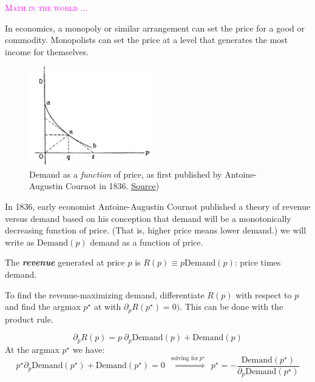 \documentclass[
  letterpaper,
  DIV=11,
  numbers=noendperiod,
  oneside]{scrreprt}
\newenvironment{intheworld}%
{%
\textcolor{magenta}{\hrulefill}%
  \par\vspace{.3\baselineskip}%
  \textcolor{magenta}{\scshape Math in the world ...}%
  \par\vspace{\baselineskip}%
}%
{\textcolor{magenta}{\hrulefill}}
\begin{document}
\begin{intheworld}

In economics, a monopoly or similar arrangement can set the price for a
good or commodity. Monopolists can set the price at a level that
generates the most income for themselves.

\begin{figure}

{\centering \includegraphics[width=0.5\textwidth,height=\textheight]{Differentiation/www/cournot-demand-curve.png}

}

\caption{\label{fig-cournot-demand2}Demand as a \emph{function} of
price, as first published by Antoine-Augustin Cournot in 1836.
\href{https://www.richmondfed.org/~/media/richmondfedorg/publications/research/economic_review/1992/pdf/er780201.pdf}{Source})}

\end{figure}

In 1836, early economist Antoine-Augustin Cournot published a theory of
revenue versus demand based on his conception that demand will be a
monotonically decreasing function of price. (That is, higher price means
lower demand.) we will write as \(\text{Demand}(p)\) demand as a
function of price.

The \textbf{\emph{revenue}} generated at price \(p\) is
\(R(p) \equiv p \text{Demand}(p)\): price times demand.

To find the revenue-maximizing demand, differentiate \(R(p)\) with
respect to \(p\) and find the argmax \(p^\star\) at with
\(\partial_p R(p^\star) = 0).\) This can be done with the product rule.

\[\partial_p R(p) = p \ \partial_p \text{Demand}(p) + \text{Demand}(p)\]
At the argmax \(p^\star\) we have:
\[p^\star \partial_p \text{Demand}(p^\star) + \text{Demand}(p^\star) = 0 \ \ \stackrel{\text{solving for}\ p^\star}{\Longrightarrow} \ \ p^\star = - \frac{\text{Demand}(p^\star)}{\partial_p \text{Demand}(p^\star)}\]


\end{intheworld}
\end{document}
